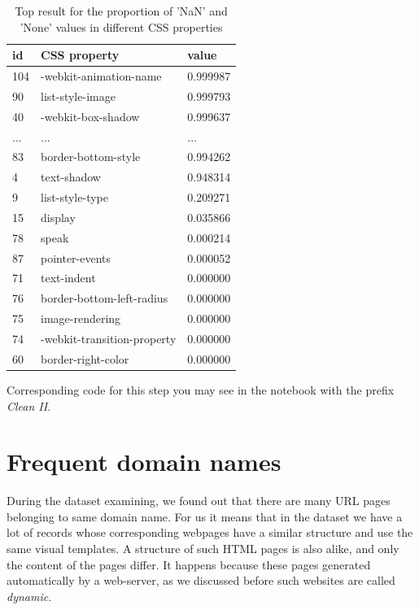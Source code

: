 \begin{table}[h]
\begin{center}
{\renewcommand{\arraystretch}{1.5}
\begin{tabular}{| p{2cm} | p{5cm}| p{3cm} |}
\hline
\textbf{id}	&	\textbf{CSS property}	&	\textbf{value} \\
\hline
104	&	-webkit-animation-name	&	0.999987 \\
\hline
90	&	list-style-image	&	0.999793 \\
\hline
40	&	-webkit-box-shadow	&	0.999637 \\
\hline
...	&	...	&	... \\
\hline
83	&	border-bottom-style	&	0.994262 \\
\hline
4	&	text-shadow	&	0.948314 \\
\hline
9	&	list-style-type	&	0.209271 \\
\hline
15	&	display	&	0.035866 \\
\hline
78	&	speak	&	0.000214 \\
\hline
87	&	pointer-events	&	0.000052 \\
\hline
71	&	text-indent	&	0.000000 \\
\hline
76	&	border-bottom-left-radius	&	0.000000 \\
\hline
75	&	image-rendering	&	0.000000 \\
\hline
74	&	-webkit-transition-property	&	0.000000 \\
\hline
60	&	border-right-color	&	0.000000 \\
\hline
\end{tabular}}
\caption{Top result for the proportion of 'NaN' and 'None' values in different CSS properties }
\label{table:cssnan}
\end{center}
\end{table}


Corresponding code for this step you may see in the notebook with the prefix \textit{Clean II}.

\section{Frequent domain names}
During the dataset examining, we found out that there are many URL pages belonging to same domain name. For us it means that in the dataset we have a lot of records whose corresponding webpages have a similar structure and use the same visual templates. A structure of such HTML pages is also alike, and only the content of the pages differ. It happens because these pages generated automatically by a web-server, as we discussed before such websites are called \textit{dynamic}.\\ 

